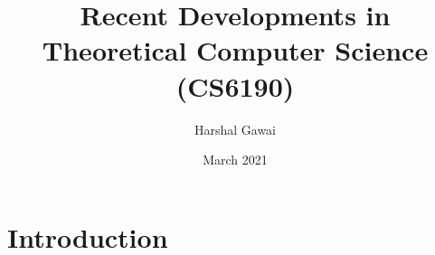 \documentclass{article}
\title{Recent Developments in Theoretical Computer Science (CS6190)}
\author{Harshal Gawai}
\date{March 2021}
\begin{document}
\maketitle

\section{Introduction}
\end{document}
